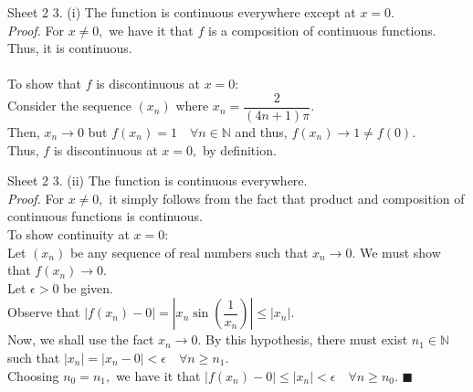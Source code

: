 \documentclass[handout, aspectratio=169]{beamer}
\begin{document}
\begin{frame}{Sheet 2}
	3. (i) The function is continuous everywhere except at $x = 0.$\\
	\emph{Proof.} For $x \neq 0,$ we have it that $f$ is a composition of continuous functions. Thus, it is continuous.\\~\\
	To show that $f$ is discontinuous at $x = 0:$\\
	Consider the sequence $(x_n)$ where $x_n = \dfrac{2}{(4n+1)\pi}.$\\
	Then, $x_n \to 0$ but $f(x_n) = 1 \quad \forall n \in \mathbb{N}$ and thus, $f(x_n) \to 1 \neq f(0).$\\
	Thus, $f$ is discontinuous at $x = 0,$ by definition.
\end{frame}
\begin{frame}{Sheet 2}
	3. (ii) The function is continuous everywhere.\\
	\emph{Proof.} For $x \neq 0,$ it simply follows from the fact that product and composition of continuous functions is continuous.\\
	To show continuity at $x = 0:$\\
	Let $(x_n)$ be any sequence of real numbers such that $x_n \to 0.$ We must show that $f(x_n) \to 0.$\\
	Let $\epsilon > 0$ be given.\\
	Observe that $|f(x_n) - 0| = \left|x_n\sin\left(\dfrac{1}{x_n}\right)\right| \le |x_n|.$\\
	Now, we shall use the fact $x_n \to 0.$ By this hypothesis, there must exist $n_1 \in \mathbb{N}$ such that $|x_n| = |x_n - 0| < \epsilon \quad \forall n \ge n_1.$\\
	Choosing $n_0 = n_1,$ we have it that $|f(x_n) - 0| \le |x_n| < \epsilon \quad \forall n \ge n_0.$ \hfill $\blacksquare$

\end{frame}
\end{document}
